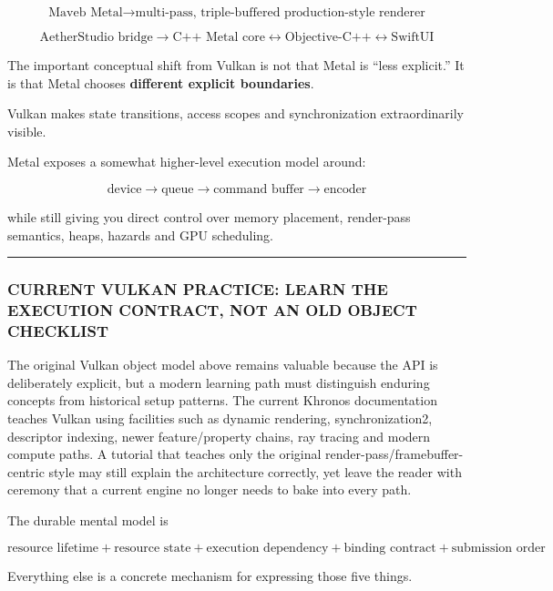 \[
\boxed{
\text{Maveb Metal}
\rightarrow
\text{multi-pass, triple-buffered production-style renderer}
}
\]

\[
\boxed{
\text{AetherStudio bridge}
\rightarrow
\text{C++ Metal core}\leftrightarrow\text{Objective-C++}\leftrightarrow\text{SwiftUI}
}
\]

The important conceptual shift from Vulkan is not that Metal is ``less explicit.'' It is that Metal chooses \textbf{different explicit boundaries}.

Vulkan makes state transitions, access scopes and synchronization extraordinarily visible.

Metal exposes a somewhat higher-level execution model around:

\[
\text{device}
\rightarrow
\text{queue}
\rightarrow
\text{command buffer}
\rightarrow
\text{encoder}
\]

while still giving you direct control over memory placement, render-pass semantics, heaps, hazards and GPU scheduling.

\begin{center}\rule{0.5\linewidth}{0.5pt}\end{center}

\subsubsection{CURRENT VULKAN PRACTICE: LEARN THE EXECUTION CONTRACT, NOT AN OLD OBJECT CHECKLIST}\label{current-vulkan-practice-learn-the-execution-contract-not-an-old-object-checklist}

The original Vulkan object model above remains valuable because the API is deliberately explicit, but a modern learning path must distinguish enduring concepts from historical setup patterns. The current Khronos documentation teaches Vulkan using facilities such as dynamic rendering, synchronization2, descriptor indexing, newer feature/property chains, ray tracing and modern compute paths. A tutorial that teaches only the original render-pass/framebuffer-centric style may still explain the architecture correctly, yet leave the reader with ceremony that a current engine no longer needs to bake into every path.

The durable mental model is

\[
\boxed{
\text{resource lifetime}
+
\text{resource state}
+
\text{execution dependency}
+
\text{binding contract}
+
\text{submission order}
}
\]

Everything else is a concrete mechanism for expressing those five things.

